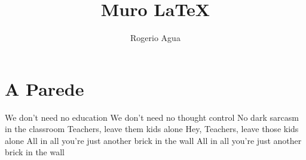 \documentclass[12pt]{article}
\title{Muro \LaTeX}
\author{Rogerio Agua}
\begin{document}
\chapter{A Parede}
\newline
We don't need no education
\newline
We don't need no thought control
\newline
No dark sarcasm in the classroom
\newline
Teachers, leave them kids alone
\newline
Hey, Teachers, leave those kids alone
\newline
All in all you're just another brick in the wall
\newline
All in all you're just another brick in the wall
\end{document}
